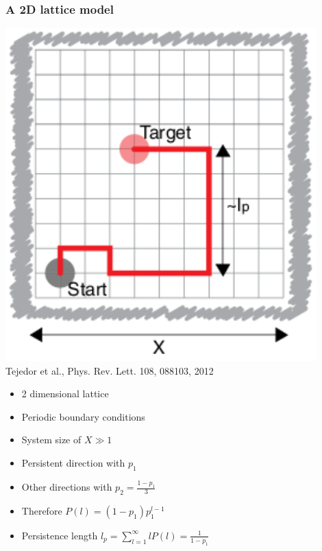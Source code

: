 \documentclass[11pt]{beamer}
\begin{document}
\begin{frame}
 \frametitle{A 2D lattice model}
 
 \begin{minipage}[h]{0.39\textwidth}
  \centering
  \includegraphics[width=0.9\textwidth]{gfx/search-trajectory.png}
  {\tiny Tejedor et al., Phys. Rev. Lett. 108, 088103, 2012}
 \end{minipage}
 \begin{minipage}[h]{0.59\textwidth}
  \begin{itemize}
   \item 2 dimensional lattice
   \item Periodic boundary conditions
   \item System size of $X \gg 1$
   \item Persistent direction with $p_1$
   \item Other directions with $p_2 =\frac{1 - p_1}{3}$
  \end{itemize}
 \end{minipage}
 \begin{itemize}
  \item Therefore $P\left(l\right) = \left(1-p_1\right) p_1^{l-1}$
  \item Persistence length $l_p = \sum^\infty_{l=1} lP\left(l\right)=\frac{1}{1-p_1}$
 \end{itemize}

\end{frame}
\end{document}
